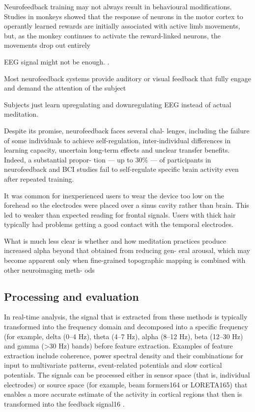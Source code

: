 \documentclass{llncs} %
\begin{document}
Neurofeedback training may not always result in behavioural modifications. Studies in monkeys showed that the response of neurons in the motor cortex to operantly learned rewards are initially associated with active limb movements, but, as the monkey continues to activate the reward-linked neurons, the movements drop out entirely \cite{Sitaram}

EEG signal might not be enough. \cite{Travis}.

Most neurofeedback systems provide auditory or visual feedback that fully engage and demand the attention of the subject \cite{brand:del}

Subjects just learn upregulating and downregulating EEG instead of actual meditation.

Despite its promise, neurofeedback faces several chal- lenges, including the failure of some individuals to achieve self-regulation, inter-individual differences in learning capacity, uncertain long-term effects and unclear transfer benefits. Indeed, a substantial propor- tion — up to 30\% — of participants in neurofeedback and BCI studies fail to self-regulate specific brain activity even after repeated training.



It was common for inexperienced users to wear the device too low on the forehead so the electrodes were placed over a sinus cavity rather than brain. This led to weaker than expected reading for frontal signals. Users with thick hair typically had problems getting a good contact with the temporal electrodes. \cite{Bashivan: et al}

What is much less clear is whether and how meditation practices produce increased alpha beyond that obtained from reducing gen- eral arousal, which may become apparent only when fine-grained topographic mapping is combined with other neuroimaging meth- ods \cite{Cahn}

\subsection{Processing and evaluation}
In real-time analysis, the signal that is extracted from these methods is typically transformed into the frequency domain and decomposed into a specific frequency (for example, delta (0–4 Hz), theta (4–7 Hz), alpha (8–12 Hz), beta (12–30 Hz) and gamma (>30 Hz) bands) before feature extraction. Examples of feature extraction include coherence, power spectral density and their combinations for input to multivariate patterns, event-related potentials and slow cortical potentials. The signals can be processed either in sensor space (that is, individual electrodes) or source space (for example, beam formers164 or LORETA165) that enables a more accurate estimate of the activity in cortical regions that then is transformed into the feedback signal16 \cite{Sitaram}.
\end{document}
